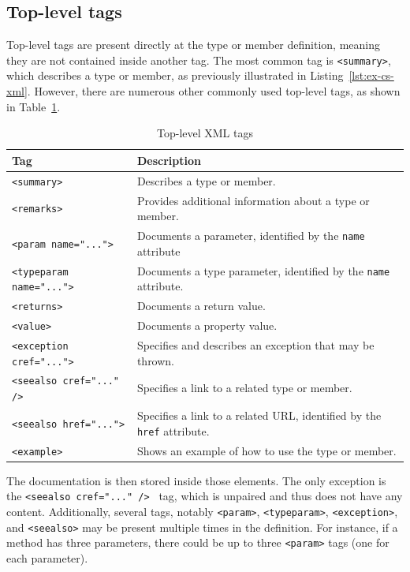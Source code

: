 \subsection{Top-level tags}

Top-level tags are present directly at the type or member definition, meaning they are not contained inside another tag.
The most common tag is \texttt{<summary>}, which describes a type or member, as previously illustrated in Listing~\ref{lst:ex-cs-xml}. 
However, there are numerous other commonly used top-level tags, as shown in Table~\ref{table:top-level-tags}.

\begin{table}[h]
\centering
\begin{tabular}{|p{6cm}|p{6cm}|}
\hline
\textbf{Tag} & \textbf{Description} \\
\hline
\texttt{<summary>} & Describes a type or member. \\
\hline
\texttt{<remarks>} & Provides additional information about a type or member. \\
\hline
\texttt{<param name="...">} & Documents a parameter, identified by the \texttt{name} attribute \\
\hline
\texttt{<typeparam name="...">} & Documents a type parameter, identified by the \texttt{name} attribute. \\
\hline
\texttt{<returns>} & Documents a return value. \\
\hline
\texttt{<value>} & Documents a property value. \\
\hline
\texttt{<exception cref="...">} & Specifies and describes an exception that may be thrown. \\
\hline
\texttt{<seealso cref="..." /> } & Specifies a link to a related type or member. \\
\hline
\texttt{<seealso href="...">} & Specifies a link to a related URL, identified by the \texttt{href} attribute. \\
\hline
\texttt{<example>} & Shows an example of how to use the type or member. \\
\hline
\end{tabular}
\caption{Top-level XML tags}
\label{table:top-level-tags}
\end{table}

The documentation is then stored inside those elements.
The only exception is the \texttt{<seealso cref="..." /> } tag, which is unpaired and thus does not have any content.
Additionally, several tags, notably \texttt{<param>}, \texttt{<typeparam>}, \texttt{<exception>}, and \texttt{<seealso>} may be present multiple times in the definition.
For instance, if a method has three parameters, there could be up to three \texttt{<param>} tags (one for each parameter).

